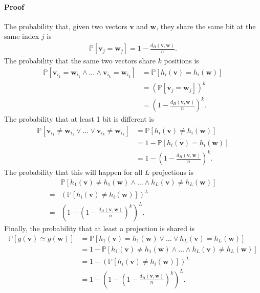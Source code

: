 \begin{enumerate}
  \paragraph{Proof} The probability that, given two vectors $\textbf{v}$ and
  $\textbf{w}$, they share the same bit at the same index $j$ is
  \begin{align*}
    \mathbb{P}[\textbf{v}_j = \textbf{w}_j] = 1 - \frac{d_H(\textbf{v},
    \textbf{w})}{n}.
  \end{align*}
  The probability that the same two vectors share $k$ positions is
  \begin{align*}
    \mathbb{P}[\textbf{v}_{i_1} = \textbf{w}_{i_1} \wedge \dots \wedge
    \textbf{v}_{i_k} = \textbf{w}_{i_k}]
    &= \mathbb{P}[h_i(\textbf{v}) = h_i(\textbf{w})] \\
    &= \left( \mathbb{P}[\textbf{v}_j = \textbf{w}_j] \right)^k \\
    &= \left( 1 - \frac{d_H(\textbf{v}, \textbf{w})}{n} \right)^k.
  \end{align*}
  The probability that at least 1 bit is different is
  \begin{align*}
    \mathbb{P}[\textbf{v}_{i_1} \neq \textbf{w}_{i_1} \vee \dots \vee
    \textbf{v}_{i_k} \neq \textbf{w}_{i_k}]
    &= \mathbb{P}[h_i(\textbf{v}) \neq h_i(\textbf{w})] \\
    &= 1 - \mathbb{P}[h_i(\textbf{v}) = h_i(\textbf{w})] \\
    &= 1 - \left( 1 - \frac{d_H(\textbf{v}, \textbf{w})}{n} \right)^k.
  \end{align*}
  The probability that this will happen for all $L$ projections is
  \begin{align*}
    &\mathbb{P}[h_1(\textbf{v}) \neq h_1(\textbf{w}) \wedge \dots \wedge
    h_L(\textbf{v}) \neq h_L(\textbf{w})] \\ = &\left(
    \mathbb{P}[h_i(\textbf{v}) \neq h_i(\textbf{w})] \right)^L \\ = &\left( 1 -
    \left( 1 - \frac{d_H(\textbf{v}, \textbf{w})}{n} \right)^k \right)^L.
  \end{align*}
  Finally, the probability that at least a projection is shared is
  \begin{align*}
    \mathbb{P}[g(\textbf{v}) \simeq g(\textbf{w})] &=
    \mathbb{P}[h_1(\textbf{v}) = h_1(\textbf{w}) \vee \dots \vee
    h_L(\textbf{v}) = h_L(\textbf{w})] \\ &= 1 -\mathbb{P}[h_1(\textbf{v}) \neq
    h_1(\textbf{w}) \wedge \dots \wedge h_L(\textbf{v}) \neq h_L(\textbf{w})] \\
    &= 1 - \left(\mathbb{P}[h_i(\textbf{v}) \neq h_i(\textbf{w})] \right)^L \\
    &= 1 - \left( 1 -\left( 1 - \frac{d_H(\textbf{v}, \textbf{w})}{n} \right)^k
    \right)^L.
  \end{align*}


\end{enumerate}
